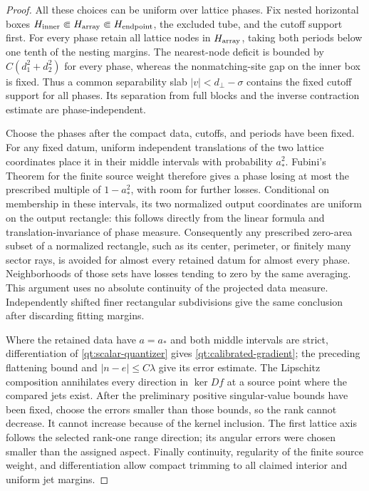 \documentclass[11pt]{article}
\numberwithin{equation}{section}
\theoremstyle{definition}
\theoremstyle{remark}
\begin{document}
\begin{proof}
All these choices can be uniform over lattice phases.  Fix nested
horizontal boxes
$H_{\rm inner}\Subset H_{\rm array}\Subset H_{\rm endpoint}$,
the excluded tube, and the cutoff support first.  For every phase
retain all lattice nodes in $H_{\rm array}$, taking both periods below
one tenth of the nesting margins.  The nearest-node deficit is bounded
by $C(d_1^2+d_2^2)$ for every phase, whereas the nonmatching-site gap
on the inner box is fixed.  Thus a common separability slab
$|v|<d_\perp-\sigma$ contains the fixed cutoff support for all phases.
Its separation from full blocks and the inverse contraction estimate
are phase-independent.

Choose the phases after the compact data, cutoffs, and periods have
been fixed.  For any fixed datum, uniform independent translations of
the two lattice coordinates place it in their middle intervals with
probability $a_*^2$.  Fubini's Theorem for the finite source weight
therefore gives a phase losing at most the prescribed multiple of
$1-a_*^2$, with room for further losses.  Conditional on membership
in these intervals, its two normalized output coordinates are uniform
on the output rectangle: this follows directly from the linear
formula and translation-invariance of phase measure.  Consequently
any prescribed zero-area subset of a normalized rectangle, such as
its center, perimeter, or finitely many sector rays, is avoided for
almost every retained datum for almost every phase.  Neighborhoods
of those sets have losses tending to zero by the same averaging.
This argument uses no absolute continuity of the projected data
measure.  Independently shifted finer rectangular subdivisions give
the same conclusion after discarding fitting margins.

Where the retained data have $a=a_*$ and both middle intervals are
strict, differentiation of \eqref{qt:scalar-quantizer} gives
\eqref{qt:calibrated-gradient}; the preceding flattening bound and
$|n-e|\leq C\lambda$ give its error estimate.  The Lipschitz
composition annihilates every direction in $\ker Df$ at a source
point where the compared jets exist.  After the preliminary positive
singular-value bounds have been fixed, choose the errors smaller than
those bounds, so the rank cannot decrease.  It cannot increase because
of the kernel inclusion.  The first lattice axis follows the selected
rank-one range direction; its angular errors were chosen smaller than
the assigned aspect.  Finally continuity, regularity of the finite
source weight, and differentiation allow compact trimming to all
claimed interior and uniform jet margins.
\end{proof}
\end{document}
